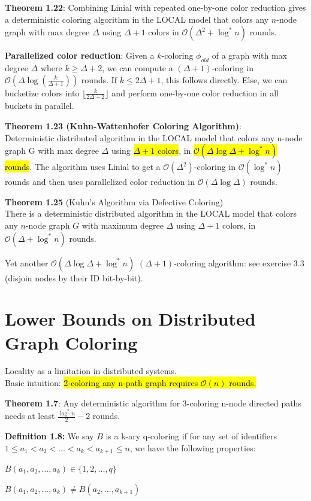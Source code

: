 \documentclass[a4paper, 8pt, landscape]{scrartcl}
\begin{document}
\begin{multicols*}{3}
\textbf{Theorem 1.22}: Combining Linial with repeated one-by-one color reduction gives a deterministic coloring algorithm in the LOCAL model that colors any $n$-node graph with max degree $\Delta$ using $\Delta+1$ colors in $\mathcal{O}(\Delta^2 + \log^* n)$ rounds.

\textbf{Parallelized color reduction}: Given a $k$-coloring $\phi_{old}$ of a graph with max degree $\Delta$ where $k \geq \Delta+2$, we can compute a $(\Delta+1)$-coloring in $\mathcal{O}(\Delta \log(\frac{k}{\Delta + 1}))$ rounds. If $k \leq 2\Delta + 1$, this follows directly. Else, we can bucketize colors into $\lfloor \frac{k}{2\Delta + 2} \rfloor$ and perform one-by-one color reduction in all buckets in parallel.

\textbf{Theorem 1.23 (Kuhn-Wattenhofer Coloring Algorithm)}:\\
Deterministic distributed algorithm in the LOCAL model that colors any n-node graph G with max degree $\Delta$ using \hl{$\Delta+1$ colors}, in \hl{$\mathcal{O}(\Delta \log \Delta + \log^* n)$ rounds}. The algorithm uses Linial to get a $\mathcal{O}(\Delta^2)$-coloring in $\mathcal{O}(\log^* n)$ rounds and then uses parallelized color reduction in $\mathcal{O}(\Delta \log \Delta)$ rounds.

\textbf{Theorem 1.25} (Kuhn's Algorithm via Defective Coloring)\\
There is a deterministic distributed algorithm in the LOCAL model that colors any $n$-node graph $G$ with maximum degree $\Delta$ using $\Delta+1$ colors, in $\mathcal{O}(\Delta + \log^* n)$ rounds.

Yet another $\mathcal{O}(\Delta \log \Delta + \log^* n)$ $(\Delta+1)$-coloring algorithm: see exercise 3.3 (disjoin nodes by their ID bit-by-bit).

\columnbreak

\section{\large{Lower Bounds on Distributed Graph Coloring}}

Locality as a limitation in distributed systems.\\
Basic intuition: \hl{2-coloring any n-path graph requires $\mathcal{O}(n)$ rounds.}

\textbf{Theorem 1.7}: Any deterministic algorithm for 3-coloring n-node directed paths needs at least $\frac{\log^* n}{2} - 2$ rounds.

\textbf{Definition 1.8:} We say $B$ is a k-ary q-coloring if for any set of identifiers $1 \leq a_1 < a_2 < ... < a_k < a_{k+1} \leq n$, we have the following properties:
\vspace*{-2mm}
\begin{compactenum}
\item $B(a_1, a_2, ..., a_k) \in \{1,2,...,q\}$
\item $B(a_1, a_2, ..., a_k) \neq B(a_2, ..., a_{k+1})$
\end{compactenum}


\end{multicols*}
\end{document}
